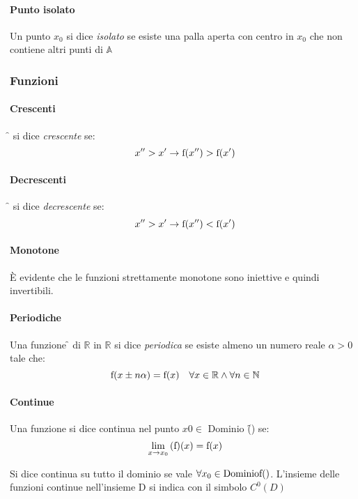     \paragraph{Punto isolato}
     Un punto $x_0$ si dice \textit{isolato} se esiste una palla aperta con centro in $x_0$ che non contiene altri punti di $\mathbb{A}$
     
     \subsubsection{Funzioni}
     
     \paragraph{Crescenti}
      \f{} si dice \textit{crescente} se:
      \[ 
      x'' > x' \to \text{f}(x'')>\text{f}(x')
      \]
      
      \paragraph{Decrescenti}
      \f{} si dice \textit{decrescente} se:
      \[
      x'' > x' \to \text{f}(x'')<\text{f}(x')
      \]
      
      \paragraph{Monotone}
      È evidente che le funzioni strettamente monotone sono iniettive e quindi invertibili.
      
      \paragraph{Periodiche}
      Una funzione \f{} di $\mathbb{R}$ in $\mathbb{R}$ si dice \textit{periodica} se esiste almeno un numero reale $\alpha >0$ tale che:
      \[
      \text{f}(x \pm n \alpha)=\text{f}(x) \quad \forall x \in \mathbb{R} \wedge \forall n \in \mathbb{N}
      \]
      
      \paragraph{Continue}
      Una funzione si dice continua nel punto $x0\in$ Dominio \f() se:
      \[
      	\mathop{\lim}\limits_{x \to x_0}\text(\text{f})(x)=\text{\text{f}}(x)
      \]
      
      Si dice continua su tutto il dominio se vale $\forall x_0\in\text{Dominio}\text{f}()$. 
      L'insieme delle funzioni continue nell'insieme D si indica con il simbolo $C^0(D)$
      
